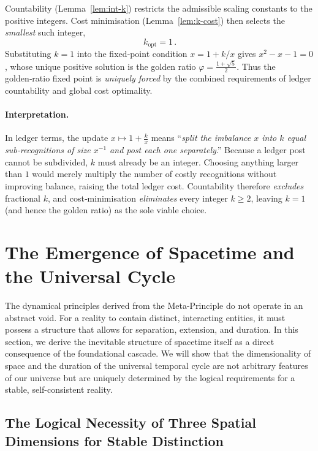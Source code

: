 \begin{theorem}
\label{thm:k=1}
Countability (Lemma \ref{lem:int-k}) restricts the admissible
scaling constants to the positive integers.
Cost minimisation (Lemma \ref{lem:k-cost}) then selects the
\emph{smallest} such integer,
\[
  \boxed{\,k_{\text{opt}} = 1\,}.
\]
Substituting \(k=1\) into the fixed‑point condition
\(x=1+k/x\) gives
\(
  x^{2}-x-1=0
\),
whose unique positive solution is the golden ratio
\(
  \displaystyle
  \varphi=\frac{1+\sqrt5}{2}.
\)
Thus the golden‑ratio fixed point is \emph{uniquely forced} by the
combined requirements of ledger countability and global
cost optimality.
\end{theorem}

\paragraph{Interpretation.}
In ledger terms, the update
\(x\mapsto1+\tfrac{k}{x}\) means “\emph{split the imbalance \(x\)
into \(k\) equal sub‑recognitions of size \(x^{-1}\) and post each
one separately}.”
Because a ledger post cannot be subdivided, \(k\) must already be an
integer.  
Choosing anything larger than \(1\) would merely multiply the number
of costly recognitions without improving balance, raising the total
ledger cost.  
Countability therefore \emph{excludes} fractional \(k\), and
cost‑minimisation \emph{eliminates} every integer \(k\ge2\),
leaving \(k=1\) (and hence the golden ratio) as the sole viable
choice.


\section{The Emergence of Spacetime and the Universal Cycle}

The dynamical principles derived from the Meta-Principle do not operate in an abstract void. For a reality to contain distinct, interacting entities, it must possess a structure that allows for separation, extension, and duration. In this section, we derive the inevitable structure of spacetime itself as a direct consequence of the foundational cascade. We will show that the dimensionality of space and the duration of the universal temporal cycle are not arbitrary features of our universe but are uniquely determined by the logical requirements for a stable, self-consistent reality.

\subsection{The Logical Necessity of Three Spatial Dimensions for Stable Distinction}

